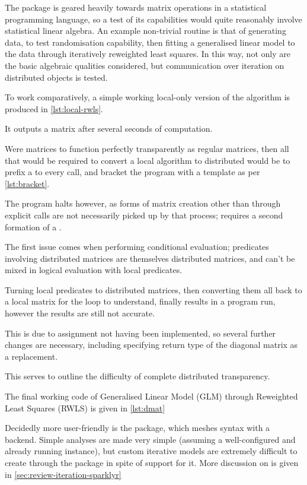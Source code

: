 The package is geared heavily towards matrix operations in a statistical programming language, so a test of its capabilities would quite reasonably involve statistical linear algebra.
An example non-trivial routine is that of generating data, to test randomisation capability, then fitting a generalised linear model to the data through iteratively reweighted least squares.
In this way, not only are the basic algebraic qualities considered, but communication over iteration on distributed objects is tested.

To work comparatively, a simple working local-only version of the algorithm is produced in \cref{lst:local-rwls}.


It outputs a  matrix after several seconds of computation.

Were  matrices to function perfectly transparently as regular matrices, then all that would be required to convert a local algorithm to distributed would be to prefix a  to every  call, and bracket the program with a template as per \cref{lst:bracket}.


The program halts however, as forms of matrix creation other than through explicit  calls are not necessarily picked up by that process;  requires a second formation of a .

The first issue comes when performing conditional evaluation; predicates involving distributed matrices are themselves distributed matrices, and can't be mixed in logical evaluation with local predicates.

Turning local predicates to distributed matrices, then converting them all back to a local matrix for the loop to understand, finally results in a program run, however the results are still not accurate.

This is due to  assignment not having been implemented, so several further changes are necessary, including specifying return type of the diagonal matrix as a replacement.

This serves to outline the difficulty of complete distributed transparency.

The final working code of  Generalised Linear Model (GLM) through Reweighted Least Squares (RWLS) is given in \cref{lst:dmat}


Decidedly more user-friendly is the  package, which meshes  syntax with a  backend.
Simple analyses are made very simple (assuming a well-configured and already running  instance), but custom iterative models are extremely difficult to create through the package in spite of  support for it.
More discussion on  is given in \cref{sec:review-iteration-sparklyr}
